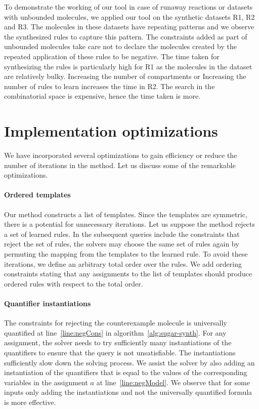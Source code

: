 \documentclass{llncs}
\begin{document}
  To demonstrate the working of our tool in case of runaway reactions or datasets with unbounded molecules, we applied our tool on the synthetic datasets R1, R2 and R3. The molecules in these datasets have repeating patterns and we observe the synthesized rules to capture this pattern. The constraints added as part of unbounded molecules take care not to declare the molecules created by the repeated application of these rules to be negative. The time taken for synthesizing the rules is particularly high for R1 as the molecules in the dataset are relatively bulky. Increasing the number of compartments or Increasing the number of rules to learn increases the time in R2. The search in the combinatorial space is expensive, hence the time taken is more. 
  
\section{Implementation optimizations}

We have incorporated several optimizations to gain efficiency or reduce
the number of iterations in the method. Let us discuss some of the remarkable
optimizations.

\paragraph{Ordered templates}
Our method constructs a list of templates.
Since the templates are symmetric, there is a potential for unnecessary
iterations.
Let us suppose the method rejects a set of learned rules.
In the subsequent queries include the constraints that reject the set of rules,
the solvers may choose the same set of rules again by permuting the mapping
from the templates to the learned rule.
To avoid these iterations, we define an arbitrary total order over the rules.
We add ordering constraints stating that any assignments to the list of templates should produce
ordered rules with respect to the total order.

\paragraph{Quantifier instantiations}
The constraints for rejecting the counterexample molecule is universally quantified at line~\ref{line:negCons} in algorithm~\ref{alg:sugar-synth}.
For any assignment, the solver needs to try sufficiently many instantiations of the quantifiers
to ensure that the query is not unsatisfiable.
The instantiations sufficiently slow down the solving process.
We assist the solver by also adding an instantiation of the quantifiers that is equal
to the values of the corresponding variables in the assignment $a$ at line~\ref{line:negModel}.
We observe that for some inputs only adding the instantiations and not the universally quantified
formula is more effective.
\end{document}
